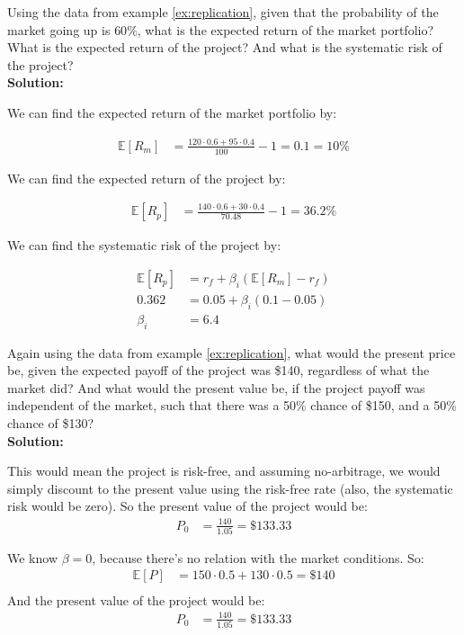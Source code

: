 \begin{example}
    Using the data from example \ref{ex:replication}, given that the probability of the market going up is $60\%$, what is the expected return of the market portfolio? What is the expected return of the project? And what is the systematic risk of the project?\\

    \textbf{Solution:}

    We can find the expected return of the market portfolio by:

    \begin{align*}
        \mathbb{E}[R_m] & = \frac{120\cdot 0.6 + 95\cdot 0.4}{100} - 1 = 0.1 = 10\%
    \end{align*}

    We can find the expected return of the project by:

    \begin{align*}
        \mathbb{E}[R_p] & = \frac{140\cdot 0.6 + 30\cdot 0.4}{70.48} - 1 = 36.2\%
    \end{align*}

    We can find the systematic risk of the project by:

    \begin{align*}
        \mathbb{E}[R_p] & = r_f + \beta_i(\mathbb{E}[R_m] - r_f) \\
        0.362           & = 0.05 + \beta_i(0.1 - 0.05)           \\
        \beta_i         & = 6.4
    \end{align*}
\end{example}

\begin{example}
    Again using the data from example \ref{ex:replication}, what would the present price be, given the expected payoff of the project was \$140, regardless of what the market did? And what would the present value be, if the project payoff was independent of the market, such that there was a 50\% chance of \$150, and a 50\% chance of \$130?\\

    \textbf{Solution:}

    This would mean the project is risk-free, and assuming no-arbitrage, we would simply discount to the present value using the risk-free rate (also, the systematic risk would be zero). So the present value of the project would be:
    \begin{align}
        P_0 & = \frac{140}{1.05} = \$133.33
    \end{align}

    We know $\beta = 0$, because there's no relation with the market conditions. So:
    \begin{align}
        \mathbb{E}[P] & = 150\cdot 0.5 + 130\cdot 0.5 = \$140 \\
    \end{align}
    And the present value of the project would be:
    \begin{align}
        P_0 & = \frac{140}{1.05} = \$133.33
    \end{align}

\end{example}


